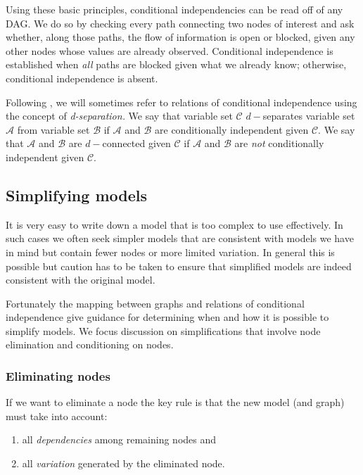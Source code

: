 \documentclass[
  12pt,
]{book}
\providecommand{\tightlist}{%
  \setlength{\itemsep}{0pt}\setlength{\parskip}{0pt}}
\begin{document}
Using these basic principles, conditional independencies can be read off of any DAG. We do so by checking every path connecting two nodes of interest and ask whether, along those paths, the flow of information is open or blocked, given any other nodes whose values are already observed. Conditional independence is established when \emph{all} paths are blocked given what we already know; otherwise, conditional independence is absent.

Following \citet{pearl2000causality}, we will sometimes refer to relations of conditional independence using the concept of \emph{d-separation.} We say that variable set \(\mathcal C\) \(d-\)separates variable set \(\mathcal A\) from variable set \(\mathcal B\) if \(\mathcal A\) and \(\mathcal B\) are conditionally independent given \(\mathcal C\). We say that \(\mathcal A\) and \(\mathcal B\) are \(d-\)connected given \(\mathcal C\) if \(\mathcal A\) and \(\mathcal B\) are \emph{not} conditionally independent given \(\mathcal C\).

\hypertarget{simplifying-models}{%
\subsection{Simplifying models}\label{simplifying-models}}

It is very easy to write down a model that is too complex to use effectively. In such cases we often seek simpler models that are consistent with models we have in mind but contain fewer nodes or more limited variation. In general this is possible but caution has to be taken to ensure that simplified models are indeed consistent with the original model.

Fortunately the mapping between graphs and relations of conditional independence give guidance for determining when and how it is possible to simplify models. We focus discussion on simplifications that involve node elimination and conditioning on nodes.

\hypertarget{eliminating-nodes}{%
\subsubsection{Eliminating nodes}\label{eliminating-nodes}}

If we want to eliminate a node the key rule is that the new model (and graph) must take into account:

\begin{enumerate}
\def\labelenumi{(\alph{enumi})}
\tightlist
\item
  all \emph{dependencies} among remaining nodes and
\item
  all \emph{variation} generated by the eliminated node.
\end{enumerate}
\end{document}
